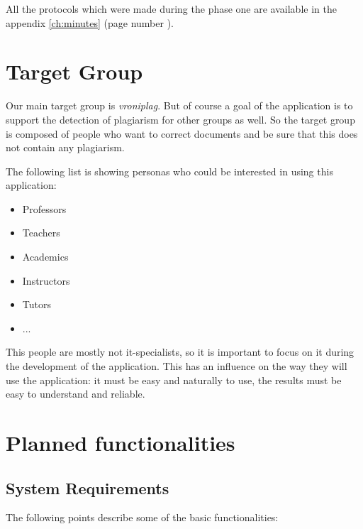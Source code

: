 All the protocols which were made during the phase one are available in the appendix \ref{ch:minutes} 
(page number \pageref{ch:minutes}).

\section{Target Group}

Our main target group is \textit{vroniplag}.
\minisec{}
But of course a goal of the application is to support the detection of plagiarism for other groups as well. So the target group is composed of people who want to correct documents and be sure that this does not contain any plagiarism.

The following list is showing personas who could be interested in using this application:

\begin{itemize}
\item Professors 
\item Teachers
\item Academics
\item Instructors
\item Tutors
\item ...
\end{itemize}

This people are mostly not it-specialists, so it is important to focus on it during the development of the application. This has an influence on the way they will use the application: it must be easy and naturally to use, the results must be easy to understand and reliable.
\section{Planned functionalities}
\subsection{System Requirements}

The following points describe some of the basic functionalities:

